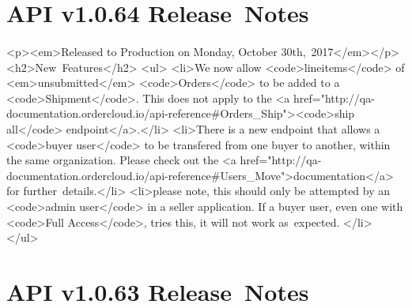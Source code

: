 \documentclass{memoir}%
\begin{document}
%
\section*{API v1.0.64 Release~Notes}%
\paragraph*{}%

%
\paragraph*{}%
<p><em>Released to Production on Monday, October 30th,~2017</em></p>\newline%
<h2>New~Features</h2>\newline%
<ul>\newline%
<li>We now allow <code>lineitems</code> of <em>unsubmitted</em> <code>Orders</code> to be added to a <code>Shipment</code>. This does not apply to the <a href="http://qa{-}documentation.ordercloud.io/api{-}reference\#Orders\_Ship"><code>ship all</code> endpoint</a>.</li>\newline%
<li>There is a new endpoint that allows a <code>buyer user</code> to be transfered from one buyer to another, within the same organization. Please check out the <a href="http://qa{-}documentation.ordercloud.io/api{-}reference\#Users\_Move">documentation</a> for further~details.</li>\newline%
<li>please note, this should only be attempted by an <code>admin user</code> in a seller application. If a buyer user, even one with <code>Full Access</code>, tries this, it will not work as~expected. </li>\newline%
</ul>

%
\section*{API v1.0.63 Release~Notes}%
\paragraph*{}%

%
\end{document}
